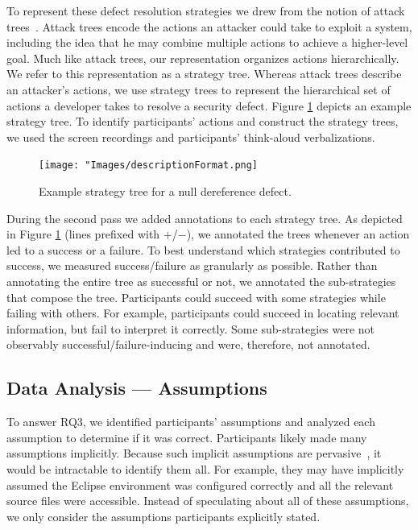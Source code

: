 \documentclass[10pt,journal,compsoc]{IEEEtran}
\begin{document}
To represent these defect resolution strategies we drew from the notion of attack trees~\cite{attackTrees}. 
Attack trees encode the actions an attacker could take to exploit a system, including the idea that he may combine multiple actions to achieve a higher-level goal. 
Much like attack trees, our representation organizes actions hierarchically.
We refer to this representation as a strategy tree.
Whereas attack trees describe an attacker's actions, we use strategy trees to represent the hierarchical set of actions a developer takes to resolve a security defect. 
Figure \ref{fig:description} depicts an example strategy tree.
To identify participants' actions and construct the strategy trees, we used the screen recordings and participants' think-aloud verbalizations. 

\begin{figure}
	\centering
	\texttt{[image: "Images/descriptionFormat.png]}
	\caption{Example strategy tree for a null dereference defect. }
	\label{fig:description} 
\end{figure}



During the second pass we added annotations to each strategy tree. 
As depicted in Figure \ref{fig:description} (lines prefixed with $+$/$-$), we annotated the trees whenever an action led to a success or a failure. 
To best understand which strategies contributed to success, we measured success/failure as granularly as possible.
Rather than annotating the entire tree as successful or not, we annotated the sub-strategies that compose the tree.
Participants could succeed with some strategies while failing with others.
For example, participants could succeed in locating relevant information, but fail to interpret it correctly. 
Some sub-strategies were not observably successful/failure-inducing and were, therefore, not annotated. 


\subsection{Data Analysis --- Assumptions}
\label{sec:assumptionAnalysis}
 
To answer RQ3, we identified participants' assumptions and analyzed each assumption to determine if it was correct.
Participants likely made many assumptions implicitly. 
Because such implicit assumptions are pervasive~\cite{fairclough2003analysing}, it would be intractable to identify them all. 
For example, they may have implicitly assumed the Eclipse environment was configured correctly and all the relevant source files were accessible.
Instead of speculating about all of these assumptions, we only consider the assumptions participants explicitly stated.
\end{document}
